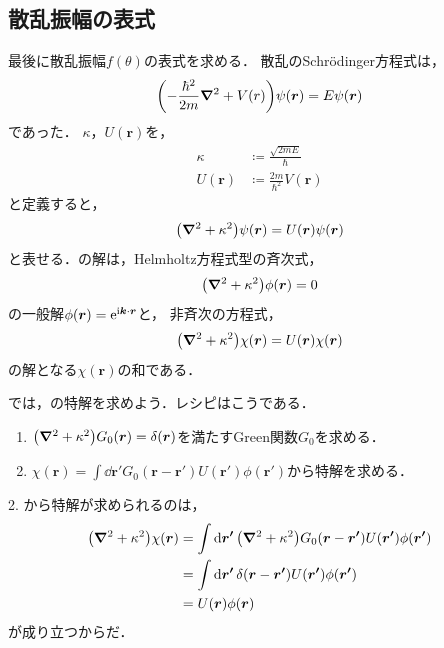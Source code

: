\documentclass{report}
\begin{document}
  \subsection{散乱振幅の表式}
    最後に散乱振幅$f(\theta)$の表式を求める．
    散乱のSchrödinger方程式は，
    \begin{align}
      \qty(-\frac{\hbar^2}{2m}\grad^2 + V(r))\psi(\bm{r}) = E\psi(\bm{r})
    \end{align}
    であった．
    $\kappa$，$U(\bm{r})$を，
    \begin{align}
        \kappa &\coloneqq \frac{\sqrt{2mE}}{\hbar} \\
        U(\bm{r}) &\coloneqq \frac{2m}{\hbar^2} V(\bm{r})
    \end{align}
    と定義すると，
    \begin{align}
      \qty(\grad^2 + \kappa^2)\psi(\bm{r}) = U(\bm{r}) \psi(\bm{r}) \label{helmholtz-eq}
    \end{align}
    と表せる．の解は，Helmholtz方程式型の斉次式，
    \begin{align}
      \qty(\grad^2 + \kappa^2)\phi(\bm{r}) = 0
    \end{align}
    の一般解$\phi(\bm{r}) = \mathrm{e}^{\mathrm{i} \bm{k} \cdot\bm{r}}$と，
    非斉次の方程式，
    \begin{align}
      \qty(\grad^2 + \kappa^2)\chi(\bm{r}) = U(\bm{r}) \chi(\bm{r})\label{particular-solution}
    \end{align}
    の解となる$\chi(\bm{r})$の和である．
    \par
    では，の特解を求めよう．レシピはこうである．
    \begin{enumerate}
      \item $\qty(\grad^2 + \kappa^2)G_0(\bm{r}) = \delta(\bm{r})$を満たすGreen関数$G_0$を求める．
      \item $\chi(\bm{r}) = \int\dd{\bm{r'}}  G_0(\bm{r} - \bm{r'}) U(\bm{r'}) \phi(\bm{r'}) $から特解を求める．
    \end{enumerate}
    2. から特解が求められるのは，
    \begin{align}
      \qty(\grad^2 + \kappa^2)\chi(\bm{r}) &= \int \dd{\bm{r'}}\qty(\grad^2 + \kappa^2)G_0(\bm{r} - \bm{r'}) U(\bm{r'}) \phi(\bm{r'}) \\
      &= \int\dd{\bm{r'}} \delta(\bm{r} - \bm{r'}) U(\bm{r'}) \phi(\bm{r'}) \\
      &= U(\bm{r}) \phi(\bm{r})
    \end{align}
    が成り立つからだ．
\end{document}
